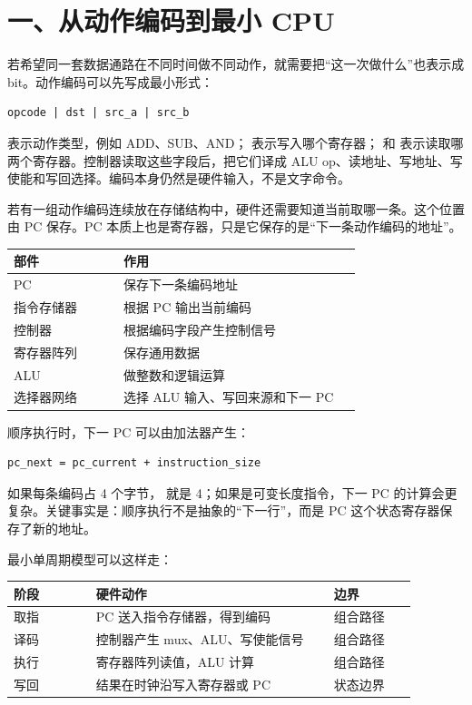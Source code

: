 \section{一、从动作编码到最小 CPU}

若希望同一套数据通路在不同时间做不同动作，就需要把“这一次做什么”也表示成 bit。动作编码可以先写成最小形式：

\begin{lstlisting}
opcode | dst | src_a | src_b
\end{lstlisting}

 表示动作类型，例如 ADD、SUB、AND； 表示写入哪个寄存器； 和  表示读取哪两个寄存器。控制器读取这些字段后，把它们译成 ALU op、读地址、写地址、写使能和写回选择。编码本身仍然是硬件输入，不是文字命令。

若有一组动作编码连续放在存储结构中，硬件还需要知道当前取哪一条。这个位置由 PC 保存。PC 本质上也是寄存器，只是它保存的是“下一条动作编码的地址”。

\begin{longtable}{L{0.24\linewidth}L{0.52\linewidth}}
\toprule
部件 & 作用 \\
\midrule
PC & 保存下一条编码地址 \\
指令存储器 & 根据 PC 输出当前编码 \\
控制器 & 根据编码字段产生控制信号 \\
寄存器阵列 & 保存通用数据 \\
ALU & 做整数和逻辑运算 \\
选择器网络 & 选择 ALU 输入、写回来源和下一 PC \\
\bottomrule
\end{longtable}

顺序执行时，下一 PC 可以由加法器产生：

\begin{lstlisting}
pc_next = pc_current + instruction_size
\end{lstlisting}

如果每条编码占 4 个字节， 就是 4；如果是可变长度指令，下一 PC 的计算会更复杂。关键事实是：顺序执行不是抽象的“下一行”，而是 PC 这个状态寄存器保存了新的地址。

最小单周期模型可以这样走：

\begin{longtable}{L{0.18\linewidth}L{0.52\linewidth}L{0.18\linewidth}}
\toprule
阶段 & 硬件动作 & 边界 \\
\midrule
取指 & PC 送入指令存储器，得到编码 & 组合路径 \\
译码 & 控制器产生 mux、ALU、写使能信号 & 组合路径 \\
执行 & 寄存器阵列读值，ALU 计算 & 组合路径 \\
写回 & 结果在时钟沿写入寄存器或 PC & 状态边界 \\
\bottomrule
\end{longtable}

